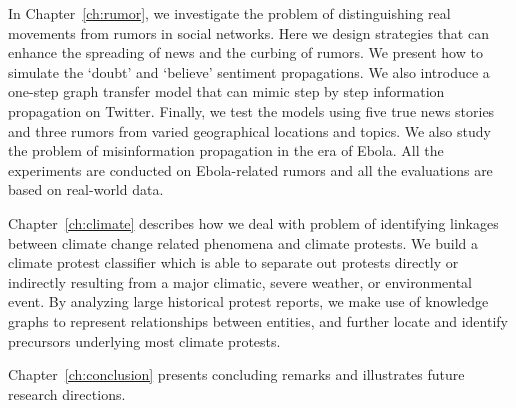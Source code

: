 In Chapter~\ref{ch:rumor}, we investigate the problem of distinguishing real movements from rumors in social networks. Here we design strategies that can enhance the spreading of news and the curbing of rumors. We present how to simulate the `doubt' and `believe' sentiment propagations. We also introduce a one-step graph transfer model that can mimic step by step information propagation on Twitter. Finally, we test the models using five true news stories and three rumors from varied geographical locations and topics. We also study the problem of misinformation propagation in the era of Ebola. All the experiments are conducted on Ebola-related rumors and all the evaluations are based on real-world data.

Chapter~\ref{ch:climate} describes how we deal with problem of identifying linkages between climate change related phenomena and climate protests. We build a climate protest classifier which is able to separate out protests directly or indirectly resulting from a major climatic, severe weather, or environmental event. By analyzing large historical protest reports, we make use of knowledge graphs to represent relationships between entities, and further locate and identify precursors underlying most climate protests.

Chapter~\ref{ch:conclusion} presents concluding remarks and illustrates future research directions.


